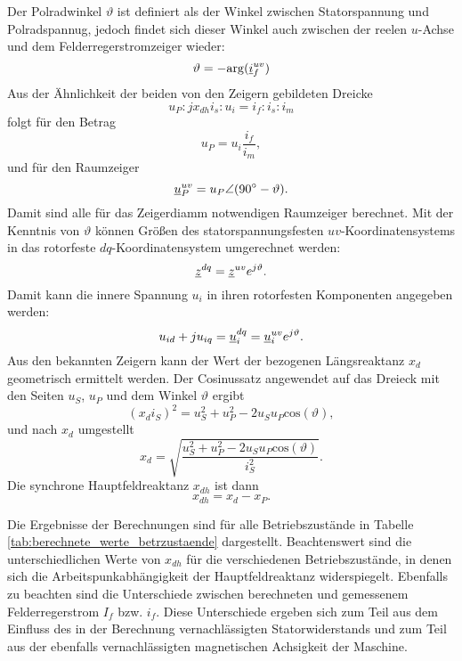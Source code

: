 \noindent Der Polradwinkel $\vartheta$ ist definiert als der Winkel zwischen Statorspannung und Polradspannug, jedoch findet sich dieser Winkel auch zwischen der reelen $u$-Achse und dem Felderregerstromzeiger wieder:
\begin{equation*}
    \vartheta=-\mathrm{arg}(\underline{i}^{uv}_f)
\end{equation*}
Aus der Ähnlichkeit der beiden von den Zeigern gebildeten Dreicke
\begin{equation*}
    u_P : j x_{dh} i_s : u_i = i_f : i_s : i_m
\end{equation*}
folgt für den Betrag
\begin{equation*}
    u_P = u_i \frac{i_f}{i_m},
\end{equation*}
und für den Raumzeiger
\begin{equation*}
    \underline{u}^{uv}_P = u_P \angle (90\degree-\vartheta).
\end{equation*}
Damit sind alle für das Zeigerdiamm notwendigen Raumzeiger berechnet.
Mit der Kenntnis von $\vartheta$ können Größen des statorspannungsfesten $uv$-Koordinatensystems in das rotorfeste $dq$-Koordinatensystem umgerechnet werden:
\begin{equation*}
    \underline{z}^{dq} = \underline{z}^{uv} e^{j \vartheta}.
\end{equation*}
Damit kann die innere Spannung $u_i$ in ihren rotorfesten Komponenten angegeben werden:
\begin{equation*}
    u_{id}+j u_{iq} = \underline{u}^{dq}_i = \underline{u}^{uv}_i e^{j \vartheta}.
\end{equation*}
Aus den bekannten Zeigern kann der Wert der bezogenen Längsreaktanz $x_d$ geometrisch ermittelt werden. Der Cosinussatz angewendet auf das Dreieck mit den Seiten $u_S$, $u_P$ und dem Winkel $\vartheta$ ergibt
\begin{equation*}
    (x_d i_S)^2 = u_S^2 +u_P^2-2 u_S u_P \mathrm{cos}(\vartheta),
\end{equation*}
und nach $x_d$ umgestellt
\begin{equation*}
    x_d=\sqrt{\frac{u_S^2 +u_P^2-2 u_S u_P \mathrm{cos}(\vartheta)}{i_S^2}}.
\end{equation*}
Die synchrone Hauptfeldreaktanz $x_{dh}$ ist dann
\begin{equation*}
    x_{dh}=x_d-x_P.
\end{equation*}

\noindent Die Ergebnisse der Berechnungen sind für alle Betriebszustände in Tabelle \ref{tab:berechnete_werte_betrzustaende} dargestellt.
Beachtenswert sind die unterschiedlichen Werte von $x_{dh}$ für die verschiedenen Betriebszustände, in denen sich die Arbeitspunkabhängigkeit der Hauptfeldreaktanz widerspiegelt.
Ebenfalls zu beachten sind die Unterschiede zwischen berechneten und gemessenem Felderregerstrom $I_f$ bzw. $i_f$. Diese Unterschiede ergeben sich zum Teil aus dem Einfluss des in der Berechnung vernachlässigten Statorwiderstands und zum Teil aus der ebenfalls vernachlässigten magnetischen Achsigkeit der Maschine. 

